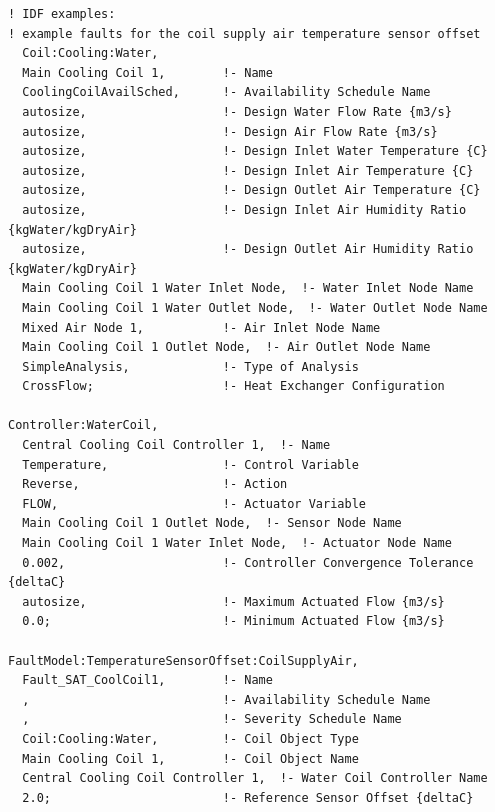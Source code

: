 \begin{lstlisting}
! IDF examples:
! example faults for the coil supply air temperature sensor offset
  Coil:Cooling:Water,
  Main Cooling Coil 1,        !- Name
  CoolingCoilAvailSched,      !- Availability Schedule Name
  autosize,                   !- Design Water Flow Rate {m3/s}
  autosize,                   !- Design Air Flow Rate {m3/s}
  autosize,                   !- Design Inlet Water Temperature {C}
  autosize,                   !- Design Inlet Air Temperature {C}
  autosize,                   !- Design Outlet Air Temperature {C}
  autosize,                   !- Design Inlet Air Humidity Ratio {kgWater/kgDryAir}
  autosize,                   !- Design Outlet Air Humidity Ratio {kgWater/kgDryAir}
  Main Cooling Coil 1 Water Inlet Node,  !- Water Inlet Node Name
  Main Cooling Coil 1 Water Outlet Node,  !- Water Outlet Node Name
  Mixed Air Node 1,           !- Air Inlet Node Name
  Main Cooling Coil 1 Outlet Node,  !- Air Outlet Node Name
  SimpleAnalysis,             !- Type of Analysis
  CrossFlow;                  !- Heat Exchanger Configuration

Controller:WaterCoil,
  Central Cooling Coil Controller 1,  !- Name
  Temperature,                !- Control Variable
  Reverse,                    !- Action
  FLOW,                       !- Actuator Variable
  Main Cooling Coil 1 Outlet Node,  !- Sensor Node Name
  Main Cooling Coil 1 Water Inlet Node,  !- Actuator Node Name
  0.002,                      !- Controller Convergence Tolerance {deltaC}
  autosize,                   !- Maximum Actuated Flow {m3/s}
  0.0;                        !- Minimum Actuated Flow {m3/s}

FaultModel:TemperatureSensorOffset:CoilSupplyAir,
  Fault_SAT_CoolCoil1,        !- Name
  ,                           !- Availability Schedule Name
  ,                           !- Severity Schedule Name
  Coil:Cooling:Water,         !- Coil Object Type
  Main Cooling Coil 1,        !- Coil Object Name
  Central Cooling Coil Controller 1,  !- Water Coil Controller Name
  2.0;                        !- Reference Sensor Offset {deltaC}
\end{lstlisting}
